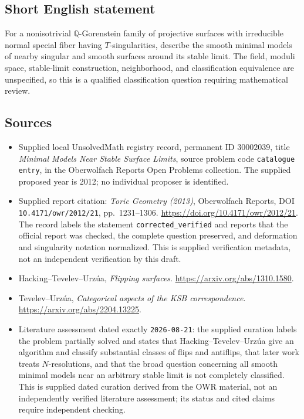 \documentclass[11pt]{article}
\newcommand{\Q}{\mathbb{Q}}
\begin{document}
\subsection{Short English statement}
For a nonisotrivial \(\Q\)-Gorenstein family of projective surfaces with irreducible normal special fiber having \(T\)-singularities, describe the smooth minimal models of nearby singular and smooth surfaces around its stable limit. The field, moduli space, stable-limit construction, neighborhood, and classification equivalence are unspecified, so this is a qualified classification question requiring mathematical review.
\subsection{Sources}
\begin{itemize}
\item Supplied local UnsolvedMath registry record, permanent ID \(30002039\), title \emph{Minimal Models Near Stable Surface Limits}, source problem code \texttt{catalogue entry}, in the Oberwolfach Reports Open Problems collection. The supplied proposed year is 2012; no individual proposer is identified.
\item Supplied report citation: \emph{Toric Geometry (2013)}, Oberwolfach Reports, DOI \texttt{10.4171/owr/2012/21}, pp.\ 1231--1306. \url{https://doi.org/10.4171/owr/2012/21}. The record labels the statement \texttt{corrected\_verified} and reports that the official report was checked, the complete question preserved, and deformation and singularity notation normalized. This is supplied verification metadata, not an independent verification by this draft.
\item Hacking--Tevelev--Urz\'ua, \emph{Flipping surfaces}. \url{https://arxiv.org/abs/1310.1580}.
\item Tevelev--Urz\'ua, \emph{Categorical aspects of the KSB correspondence}. \url{https://arxiv.org/abs/2204.13225}.
\item Literature assessment dated exactly \texttt{2026-08-21}: the supplied curation labels the problem partially solved and states that Hacking--Tevelev--Urz\'ua give an algorithm and classify substantial classes of flips and antiflips, that later work treats \(N\)-resolutions, and that the broad question concerning all smooth minimal models near an arbitrary stable limit is not completely classified. This is supplied dated curation derived from the OWR material, not an independently verified literature assessment; its status and cited claims require independent checking.
\end{itemize}
\end{document}
